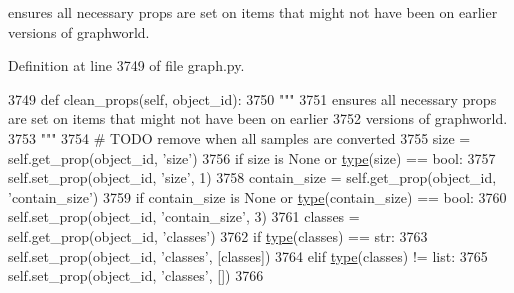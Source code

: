 \begin{DoxyVerb}ensures all necessary props are set on items that might not have been on earlier
versions of graphworld.
\end{DoxyVerb}
 

Definition at line 3749 of file graph.\+py.


\begin{DoxyCode}
3749     \textcolor{keyword}{def }clean\_props(self, object\_id):
3750         \textcolor{stringliteral}{"""}
3751 \textcolor{stringliteral}{        ensures all necessary props are set on items that might not have been on earlier}
3752 \textcolor{stringliteral}{        versions of graphworld.}
3753 \textcolor{stringliteral}{        """}
3754         \textcolor{comment}{# TODO remove when all samples are converted}
3755         size = self.get\_prop(object\_id, \textcolor{stringliteral}{'size'})
3756         \textcolor{keywordflow}{if} size \textcolor{keywordflow}{is} \textcolor{keywordtype}{None} \textcolor{keywordflow}{or} \hyperlink{namespaceparlai_1_1agents_1_1tfidf__retriever_1_1build__tfidf_ad5dfae268e23f506da084a9efb72f619}{type}(size) == bool:
3757             self.set\_prop(object\_id, \textcolor{stringliteral}{'size'}, 1)
3758         contain\_size = self.get\_prop(object\_id, \textcolor{stringliteral}{'contain\_size'})
3759         \textcolor{keywordflow}{if} contain\_size \textcolor{keywordflow}{is} \textcolor{keywordtype}{None} \textcolor{keywordflow}{or} \hyperlink{namespaceparlai_1_1agents_1_1tfidf__retriever_1_1build__tfidf_ad5dfae268e23f506da084a9efb72f619}{type}(contain\_size) == bool:
3760             self.set\_prop(object\_id, \textcolor{stringliteral}{'contain\_size'}, 3)
3761         classes = self.get\_prop(object\_id, \textcolor{stringliteral}{'classes'})
3762         \textcolor{keywordflow}{if} \hyperlink{namespaceparlai_1_1agents_1_1tfidf__retriever_1_1build__tfidf_ad5dfae268e23f506da084a9efb72f619}{type}(classes) == str:
3763             self.set\_prop(object\_id, \textcolor{stringliteral}{'classes'}, [classes])
3764         \textcolor{keywordflow}{elif} \hyperlink{namespaceparlai_1_1agents_1_1tfidf__retriever_1_1build__tfidf_ad5dfae268e23f506da084a9efb72f619}{type}(classes) != list:
3765             self.set\_prop(object\_id, \textcolor{stringliteral}{'classes'}, [])
3766 
\end{DoxyCode}
\mbox{\label{classlight__chats_1_1graph_1_1Graph_ae416efe86bf6117aec6dc1de481d0ec1}} 
